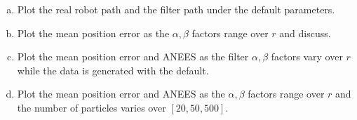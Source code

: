 \documentclass{article}
\newcommand{\?}{\stackrel{?}{=}}
\begin{document}
\begin{enumerate}[(a)]
\item Plot the real robot path and the filter path under the default
  parameters.
\item Plot the mean position error as the $\alpha, \beta$ factors
  range over $r$ and discuss.
\item Plot the mean position error and ANEES as the filter $\alpha, \beta$ factors
  vary over $r$ while the data is generated with the default.
\item Plot the mean position error and ANEES as the $\alpha, \beta$ factors
  range over $r$ and the number of particles varies over $[20, 50, 500]$.
\end{enumerate}
\end{document}
